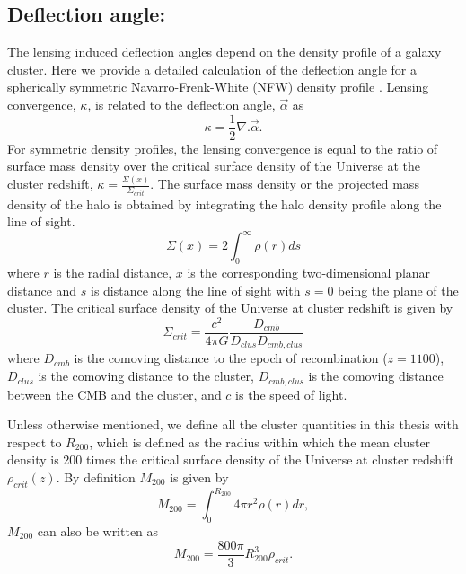 \subsection*{Deflection angle:}
\label{sec_def_field}
The lensing induced deflection angles depend on the density profile of a galaxy cluster. Here we provide a detailed calculation of the deflection angle for a spherically symmetric Navarro-Frenk-White (NFW) density profile \citep{navarro96}.  Lensing convergence, $\kappa$, is related to the deflection angle, $\vec{\alpha}$ as %
\begin{equation}
 \kappa = \frac{1}{2}\nabla. \vec{\alpha}. %
\label{eq_kappa}
 \end{equation}
 For symmetric density profiles, the lensing convergence is equal to the ratio of surface mass density over the critical surface density of the Universe at the cluster redshift, $\kappa = \frac{\Sigma(x)}{\Sigma_{crit}}$.
The surface mass density or the projected mass density of the halo is obtained by integrating the halo density profile along the line of sight. 
 \begin{equation}
 \Sigma(x) = 2 \int^{\infty}_{0} \rho(r) ds
 \label{eq:surface_density}
 \end{equation}
 where $r$ is the radial distance, $x$ is the corresponding two-dimensional planar distance and $s$ is distance along the line of sight with $s = 0$ being the plane of the cluster.
 The critical surface density of the Universe at cluster redshift is given by
 \begin{equation}
 \Sigma_{crit} = \frac{c^{2}}{4\pi G} \frac{D_{cmb}}{D_{clus}D_{cmb,clus}}
 \end{equation}
 where $D_{cmb}$ is the comoving distance to the epoch of recombination ($z= 1100$), $D_{clus}$ is the comoving distance to the cluster, $D_{cmb,clus}$ is the comoving distance between the CMB and the cluster, and $c$ is the speed of light.
 
 Unless otherwise mentioned, we define all the cluster quantities in this thesis with respect to $R_{200}$, which is defined as the radius within which the mean cluster density is 200 times the critical surface density of the Universe at cluster redshift $\rho_{crit}(z)$. By definition $M_{200}$ is given by 
 \begin{equation}
 M_{200} = \int^{R_{200}}_{0}  4\pi r^{2} \rho(r) dr,
 \end{equation}
 $M_{200}$ can also be written as
 \begin{equation}
 M_{200} = \frac{800\pi}{3} R^{3}_{200} \rho_{crit}.
 \end{equation}
 
